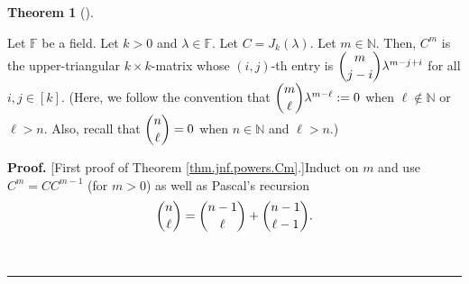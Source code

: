 \documentclass[numbers=enddot,12pt,final,onecolumn,notitlepage]{scrartcl}%
\numberwithin{exer}{subsection}
\theoremstyle{definition}
\newtheorem{theo}{Theorem}[subsection]
\newenvironment{theorem}[1][]
{\begin{theo}[#1]\begin{leftbar}}
{\end{leftbar}\end{theo}}
\newenvironment{proof}[1][Proof]{\noindent\textbf{#1.} }{\ \rule{0.5em}{0.5em}}
\begin{document}
\begin{theorem}
\label{thm.jnf.powers.Cm}Let $\mathbb{F}$ be a field. Let $k>0$ and
$\lambda\in\mathbb{F}$. Let $C=J_{k}\left(  \lambda\right)  $. Let
$m\in\mathbb{N}$. Then, $C^{m}$ is the upper-triangular $k\times k$-matrix
whose $\left(  i,j\right)  $-th entry is $\dbinom{m}{j-i}\lambda^{m-j+i}$ for
all $i,j\in\left[  k\right]  $. (Here, we follow the convention that
$\dbinom{m}{\ell}\lambda^{m-\ell}:=0$ when $\ell\notin\mathbb{N}$ or $\ell>n$.
Also, recall that $\dbinom{n}{\ell}=0$ when $n\in\mathbb{N}$ and $\ell>n$.)
\end{theorem}

\begin{proof}
[First proof of Theorem \ref{thm.jnf.powers.Cm}.]Induct on $m$ and use
$C^{m}=CC^{m-1}$ (for $m>0$) as well as Pascal's recursion%
\[
\dbinom{n}{\ell}=\dbinom{n-1}{\ell}+\dbinom{n-1}{\ell-1}.
\]

\end{proof}
\end{document}
